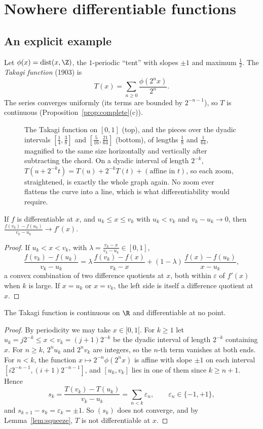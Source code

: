 \section{Nowhere differentiable functions}

\subsection*{An explicit example}

Let $\phi(x)=\operatorname{dist}(x,\Z)$, the $1$-periodic ``tent'' with slopes $\pm1$ and maximum $\frac12$. The \emph{Takagi function} (1903) is
\[T(x)=\sum_{n\ge0}\frac{\phi(2^nx)}{2^n}.\]
The series converges uniformly (its terms are bounded by $2^{-n-1}$), so $T$ is continuous (Proposition~\ref{prop:complete}(c)).

\begin{figure}[ht]
\centering
{}
\caption{The Takagi function on $[0,1]$ (top), and the pieces over the dyadic intervals $[\frac14,\frac38]$ and $[\frac5{16},\frac{21}{64}]$ (bottom), of lengths $\frac18$ and $\frac1{64}$, magnified to the same size
horizontally and vertically after subtracting the chord. On a dyadic interval of length $2^{-k}$, $T(u+2^{-k}t)=T(u)+2^{-k}T(t)+(\text{affine in }t)$, so each zoom, straightened, is exactly the
whole graph again. No zoom ever flattens the curve into a line, which is what differentiability would require.}
\label{fig:takagi}
\end{figure}

\begin{lemma}\label{lem:squeeze}
If $f$ is differentiable at $x$, and $u_k\le x\le v_k$ with $u_k<v_k$ and $v_k-u_k\to0$, then $\frac{f(v_k)-f(u_k)}{v_k-u_k}\to f'(x)$.
\end{lemma}
\begin{proof}
If $u_k<x<v_k$, with $\lambda=\frac{v_k-x}{v_k-u_k}\in[0,1]$,
\[\frac{f(v_k)-f(u_k)}{v_k-u_k}=\lambda\,\frac{f(v_k)-f(x)}{v_k-x}+(1-\lambda)\,\frac{f(x)-f(u_k)}{x-u_k},\]
a convex combination of two difference quotients at $x$, both within $\varepsilon$ of $f'(x)$ when $k$ is large. If $x=u_k$ or $x=v_k$, the left side is itself a difference quotient
at $x$.
\end{proof}

\begin{theorem}\label{thm:takagi}
The Takagi function is continuous on $\R$ and differentiable at no point.
\end{theorem}
\begin{proof}
By periodicity we may take $x\in[0,1[$. For $k\ge1$ let $u_k=j2^{-k}\le x<v_k=(j+1)2^{-k}$ be the dyadic interval of length $2^{-k}$ containing $x$. For $n\ge k$, $2^nu_k$ and $2^nv_k$ are
integers, so the $n$-th term vanishes at both ends. For $n<k$, the function $x\mapsto2^{-n}\phi(2^nx)$ is affine with slope $\pm1$ on each interval $[i2^{-n-1},(i+1)2^{-n-1}]$, and
$[u_k,v_k]$ lies in one of them since $k\ge n+1$. Hence
\[s_k=\frac{T(v_k)-T(u_k)}{v_k-u_k}=\sum_{n<k}\varepsilon_n,\qquad\varepsilon_n\in\{-1,+1\},\]
and $s_{k+1}-s_k=\varepsilon_k=\pm1$. So $(s_k)$ does not converge, and by Lemma~\ref{lem:squeeze}, $T$ is not differentiable at $x$.
\end{proof}

